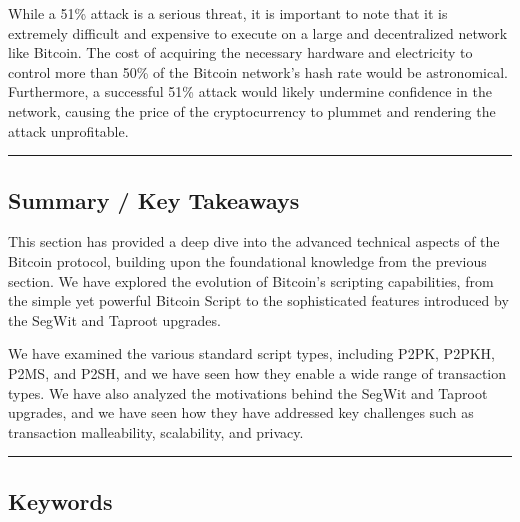 While a 51\% attack is a serious threat, it is important to note that it
is extremely difficult and expensive to execute on a large and
decentralized network like Bitcoin. The cost of acquiring the necessary
hardware and electricity to control more than 50\% of the Bitcoin
network's hash rate would be astronomical. Furthermore, a successful
51\% attack would likely undermine confidence in the network, causing
the price of the cryptocurrency to plummet and rendering the attack
unprofitable.

\begin{center}\rule{0.5\linewidth}{0.5pt}\end{center}

\subsection{Summary / Key Takeaways}\label{summary-key-takeaways}

This section has provided a deep dive into the advanced technical
aspects of the Bitcoin protocol, building upon the foundational
knowledge from the previous section. We have explored the evolution of
Bitcoin's scripting capabilities, from the simple yet powerful Bitcoin
Script to the sophisticated features introduced by the SegWit and
Taproot upgrades.

We have examined the various standard script types, including P2PK,
P2PKH, P2MS, and P2SH, and we have seen how they enable a wide range of
transaction types. We have also analyzed the motivations behind the
SegWit and Taproot upgrades, and we have seen how they have addressed
key challenges such as transaction malleability, scalability, and
privacy.

\begin{center}\rule{0.5\linewidth}{0.5pt}\end{center}

\subsection{Keywords}\label{keywords}

